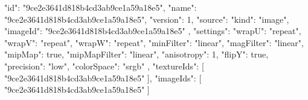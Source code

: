 {
  "id": "9ce2e3641d818b4cd3ab9ce1a59a18e5",
  "name": "9ce2e3641d818b4cd3ab9ce1a59a18e5",
  "version": 1,
  "source": {
    "kind": "image",
    "imageId": "9ce2e3641d818b4cd3ab9ce1a59a18e5"
  },
  "settings": {
    "wrapU": "repeat",
    "wrapV": "repeat",
    "wrapW": "repeat",
    "minFilter": "linear",
    "magFilter": "linear",
    "mipMap": true,
    "mipMapFilter": "linear",
    "anisotropy": 1,
    "flipY": true,
    "precision": "low",
    "colorSpace": "srgb"
  },
  "textureIds": [
    "9ce2e3641d818b4cd3ab9ce1a59a18e5"
  ],
  "imageIds": [
    "9ce2e3641d818b4cd3ab9ce1a59a18e5"
  ]
}
